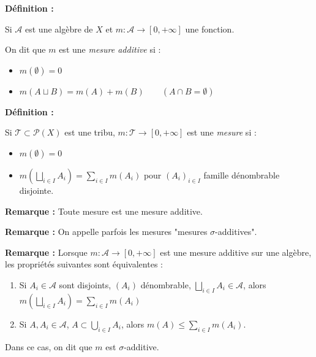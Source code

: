 \documentclass[10pt,a4paper,notitlepage ]{report}
\newenvironment{definition}{
	
	\textbf{Définition : }
}
{}
\newcounter{th}
\newenvironment{rem}{
	
	\textbf{Remarque :}}{}
\begin{document}
\begin{definition}
	Si $\mathcal A$ est une algèbre de $X$ et $m:\mathcal A \rightarrow [0,+\infty]$ une fonction.
	
	On dit que $m$ est une \emph{mesure additive} si :
	\begin{itemize}
		\item $m(\emptyset) = 0$
		\item $m(A\sqcup B) = m(A) + m(B) \qquad (A\cap B = \emptyset)$
	\end{itemize}
\end{definition}

\begin{definition}
	Si $\mathcal T \subset \mathcal P(X)$ est une tribu, $m:\mathcal T \rightarrow [0,+\infty]$ est une \emph{mesure} si :
	\begin{itemize}
		\item $m(\emptyset) = 0$
		\item $m(\underset{i\in I}{\bigsqcup}A_i) = \sum_{i\in I}m(A_i)$ pour $(A_i)_{i\in I}$ famille dénombrable disjointe.
	\end{itemize}
\end{definition}
\begin{rem}
	Toute mesure est une mesure additive.
\end{rem}

\begin{rem}
On appelle parfois les mesures "mesures $\sigma$-additives".
\end{rem}

\begin{rem}
	Lorsque $m:\mathcal A \rightarrow [0,+\infty]$ est une mesure additive sur une algèbre, les propriétés suivantes sont équivalentes :
	\begin{enumerate}
		\item Si $A_i\in\mathcal A$ sont disjoints, $(A_i)$ dénombrable, $\underset{i\in I}{\bigsqcup}A_i \in \mathcal A$, alors $m(\underset{i\in I}{\bigsqcup}A_i) = \sum_{i\in I}m(A_i)$
		\item Si $A,A_i\in\mathcal A$, $A\subset \underset{i\in I}{\bigcup}A_i$, alors $m(A) \le \sum_{i\in I}m(A_i)$.
	\end{enumerate}
Dans ce cas, on dit que $m$ est $\sigma$-additive.
\end{rem}
\end{document}
